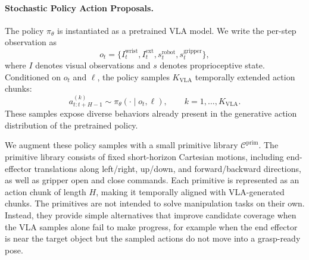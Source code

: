 










\paragraph{Stochastic Policy Action Proposals.}
The policy $\pi_\theta$ is instantiated as a pretrained VLA model. We write the per-step observation as
\[
o_t =
\{
I_t^{\mathrm{wrist}},
I_t^{\mathrm{ext}},
s_t^{\mathrm{robot}},
s_t^{\mathrm{gripper}}
\},
\]
where $I$ denotes visual observations and $s$ denotes proprioceptive state. Conditioned on $o_t$ and $\ell$, the policy samples $K_{\mathrm{VLA}}$ temporally extended action chunks:
\[
a^{(k)}_{t:t+H-1}
\sim
\pi_\theta(\cdot \mid o_t,\ell),
\qquad
k=1,\dots,K_{\mathrm{VLA}}.
\]
These samples expose diverse behaviors already present in the generative action distribution of the pretrained policy.

We augment these policy samples with a small primitive library $\mathcal{C}^{\mathrm{prim}}$. The primitive library consists of fixed short-horizon Cartesian motions, including end-effector translations along left/right, up/down, and forward/backward directions, as well as gripper open and close commands. Each primitive is represented as an action chunk of length $H$, making it temporally aligned with VLA-generated chunks. The primitives are not intended to solve manipulation tasks on their own. Instead, they provide simple alternatives that improve candidate coverage when the VLA samples alone fail to make progress, for example when the end effector is near the target object but the sampled actions do not move into a grasp-ready pose.

